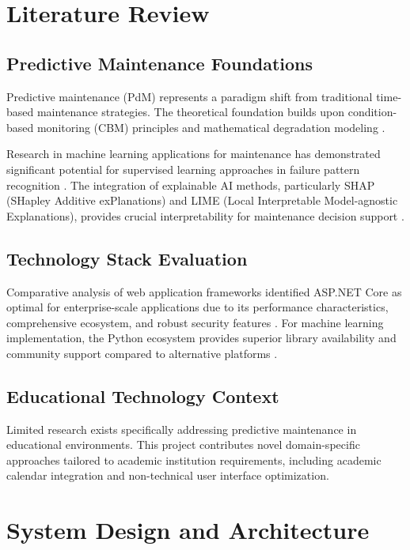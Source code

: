 \documentclass[12pt,a4paper]{report}
\begin{document}
\chapter{Literature Review}

\section{Predictive Maintenance Foundations}

Predictive maintenance (PdM) represents a paradigm shift from traditional time-based maintenance strategies. The theoretical foundation builds upon condition-based monitoring (CBM) principles and mathematical degradation modeling \cite{mobley2002introduction}.

Research in machine learning applications for maintenance has demonstrated significant potential for supervised learning approaches in failure pattern recognition \cite{susto2015machine}. The integration of explainable AI methods, particularly SHAP (SHapley Additive exPlanations) and LIME (Local Interpretable Model-agnostic Explanations), provides crucial interpretability for maintenance decision support \cite{lundberg2017unified}.

\section{Technology Stack Evaluation}

Comparative analysis of web application frameworks identified ASP.NET Core as optimal for enterprise-scale applications due to its performance characteristics, comprehensive ecosystem, and robust security features \cite{freeman2022pro}. For machine learning implementation, the Python ecosystem provides superior library availability and community support compared to alternative platforms \cite{raschka2019python}.

\section{Educational Technology Context}

Limited research exists specifically addressing predictive maintenance in educational environments. This project contributes novel domain-specific approaches tailored to academic institution requirements, including academic calendar integration and non-technical user interface optimization.

\chapter{System Design and Architecture}
\end{document}
